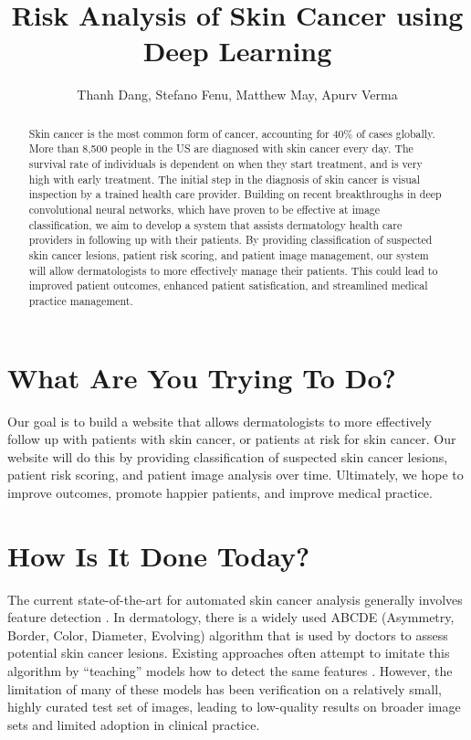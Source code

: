 \documentclass[a4paper,10pt]{article}
\title{Risk Analysis of Skin Cancer using Deep Learning}
\author{Thanh Dang, Stefano Fenu, Matthew May, Apurv Verma}
\begin{document}
\maketitle

\begin{abstract}
Skin cancer is the most common form of cancer, accounting for 40\% of cases
globally. More than 8,500 people in the US are diagnosed with skin cancer every
day. The survival rate of individuals is dependent on when they start treatment,
and is very high with early treatment. The initial step in the diagnosis of
skin cancer is visual inspection by a trained health care provider. Building on
recent breakthroughs in deep convolutional neural networks, which have proven
to be effective at image classification, we aim to develop a system that
assists dermatology health care providers in following up with their patients.
By providing classification of suspected skin cancer lesions, patient risk
scoring, and patient image management, our system will allow dermatologists
to more effectively manage their patients. This could lead to improved patient
outcomes, enhanced patient satisfication, and streamlined medical practice
management.
\end{abstract}

\section{What Are You Trying To Do?}
Our goal is to build a website that allows dermatologists to more effectively
follow up with patients with skin cancer, or patients at risk for skin cancer.
Our website will do this by providing classification of suspected skin cancer
lesions, patient risk scoring, and patient image analysis over time. Ultimately,
we hope to improve outcomes, promote happier patients, and improve medical
practice.

\section{How Is It Done Today?}
The current state-of-the-art for automated skin cancer analysis generally
involves feature detection \cite{DBLP:journals/eswa/LeeC15}. In dermatology,
there is a widely used ABCDE (Asymmetry, Border, Color, Diameter, Evolving)
\cite{thomas1998semiological} algorithm that is used by doctors to assess
potential skin cancer lesions. Existing approaches often attempt to imitate this
algorithm by ``teaching'' models how to detect the same features
\cite{zagrouba2004prelimary}. However, the limitation of many of these models
has been verification on a relatively small, highly curated test set of images,
leading to low-quality results on broader image sets and limited adoption in
clinical practice.
\end{document}
